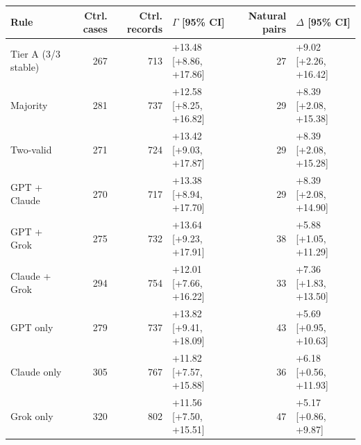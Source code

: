 \begin{tabular}{lrrlrl}
\toprule
Rule & Ctrl. cases & Ctrl. records & $\Gamma$ [95\% CI] & Natural pairs & $\Delta$ [95\% CI]\\
\midrule
Tier A (3/3 stable) & 267 & 713 & +13.48 [+8.86, +17.86] & 27 & +9.02 [+2.26, +16.42]\\
Majority & 281 & 737 & +12.58 [+8.25, +16.82] & 29 & +8.39 [+2.08, +15.38]\\
Two-valid & 271 & 724 & +13.42 [+9.03, +17.87] & 29 & +8.39 [+2.08, +15.28]\\
GPT + Claude & 270 & 717 & +13.38 [+8.94, +17.70] & 29 & +8.39 [+2.08, +14.90]\\
GPT + Grok & 275 & 732 & +13.64 [+9.23, +17.91] & 38 & +5.88 [+1.05, +11.29]\\
Claude + Grok & 294 & 754 & +12.01 [+7.66, +16.22] & 33 & +7.36 [+1.83, +13.50]\\
GPT only & 279 & 737 & +13.82 [+9.41, +18.09] & 43 & +5.69 [+0.95, +10.63]\\
Claude only & 305 & 767 & +11.82 [+7.57, +15.88] & 36 & +6.18 [+0.56, +11.93]\\
Grok only & 320 & 802 & +11.56 [+7.50, +15.51] & 47 & +5.17 [+0.86, +9.87]\\
\bottomrule
\end{tabular}
